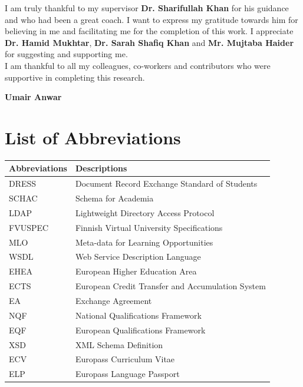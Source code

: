 \documentclass[12pt,a4paper,oneside]{book}
\begin{document}
I am truly thankful to my supervisor {\bfseries Dr. Sharifullah Khan} for his guidance and who had been a great coach. I want to express my gratitude towards him for believing in me and facilitating me for the completion of this work. I appreciate {\bfseries Dr. Hamid Mukhtar}, {\bfseries Dr. Sarah Shafiq Khan} and {\bfseries Mr. Mujtaba Haider} for suggesting and supporting me. \\

I am thankful to all my colleagues, co-workers and contributors who were supportive in completing this research.

\begin{flushright} \textbf{Umair Anwar} \end{flushright}

\tableofcontents
%
%
%
\chapter*{List of Abbreviations}

\begin{table}[h]
    \renewcommand{\arraystretch}{1.3}
    \label{table:table1}
     \begin{tabular}{ll}
        \hline\hline
            {\bfseries Abbreviations} & {\bfseries Descriptions} \\
            \hline                                      %
            DRESS & Document Record Exchange Standard of Students  \\
            SCHAC & Schema for Academia  \\
            LDAP & Lightweight Directory Access Protocol \\
            FVUSPEC & Finnish Virtual University Specifications  \\
            MLO & Meta-data for Learning Opportunities  \\
            WSDL & Web Service Description Language  \\
            EHEA & European Higher Education Area  \\
            ECTS & European Credit Transfer and Accumulation System  \\
            EA & Exchange Agreement  \\
            NQF & National Qualifications Framework  \\
            EQF & European Qualifications Framework  \\
            XSD & XML Schema Definition  \\
            ECV & Europass Curriculum Vitae \\
            ELP & Europass Language Passport \\
            
            \hline                          %
    \end{tabular}
\end{table}
\end{document}
